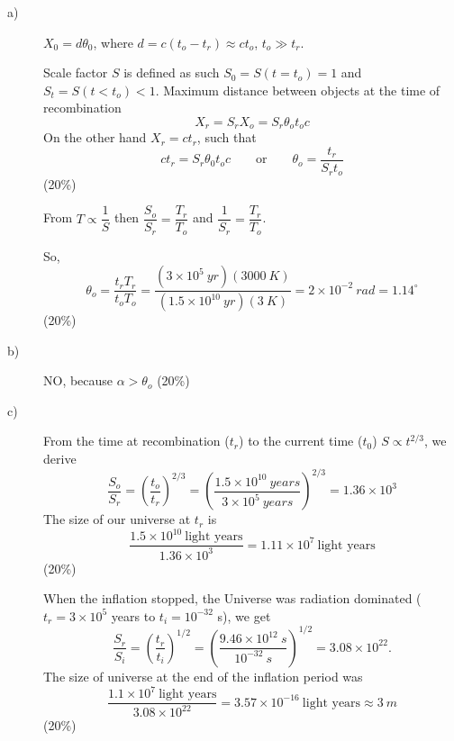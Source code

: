 
\begin{description}
\item[a)] $X_0 = d\theta_0$, where $d = c(t_o - t_r) \approx ct_o$,
$t_o \gg t_r$.

Scale factor $S$ is defined as such $S_0 = S(t=t_o) = 1$ and
$S_t = S(t<t_o) < 1$. Maximum distance between objects at the time of
recombination
\[
X_r = S_r X_o = S_r \theta_o t_o c
\]
On the other hand $X_r = ct_r$, such that
\[
ct_r = S_r\theta_0 t_o c
\qquad\text{or}\qquad
\theta_o = \frac{t_r}{S_r t_o}
\]
\hfill(20\%)

From $T \propto \dfrac{1}{S}$ then
$\dfrac{S_o}{S_r} = \dfrac{T_r}{T_o}$ and
$\dfrac{1}{S_r} = \dfrac{T_r}{T_o}$.

So,
\[
\theta_o = \frac{t_r T_r}{t_o T_o}
= \frac{(3\times10^{5}\ yr)(3000\ K)}{(1.5\times10^{10}\ yr)(3\ K)}
= 2\times10^{-2}\ rad = 1.14^\circ
\]
\hfill(20\%)

\item[b)] NO, because $\alpha > \theta_o$
\hfill(20\%)

\item[c)]
From the time at recombination ($t_r$) to the current time ($t_0$)
$S \propto t^{2/3}$, we derive
\[
\frac{S_o}{S_r} = \left(\frac{t_o}{t_r}\right)^{2/3}
= \left(\frac{1.5\times10^{10}\ years}{3\times10^{5}\ years}\right)^{2/3}
= 1.36\times10^{3}
\]
The size of our universe at $t_r$ is
\[
\frac{1.5\times10^{10}\ \text{light years}}{1.36\times10^{3}}
= 1.11\times10^{7}\ \text{light years}
\]
\hfill(20\%)

When the inflation stopped, the Universe was radiation dominated
($t_r = 3\times10^{5}$ years to $t_i = 10^{-32}$ s), we get
\[
\frac{S_r}{S_i} = \left(\frac{t_r}{t_i}\right)^{1/2}
= \left(\frac{9.46\times10^{12}\ s}{10^{-32}\ s}\right)^{1/2}
= 3.08\times10^{22}.
\]
The size of universe at the end of the inflation period was
\[
\frac{1.1\times10^{7}\ \text{light years}}{3.08\times10^{22}}
= 3.57\times10^{-16}\ \text{light years} \approx 3\ m
\]
\hfill(20\%)
\end{description}
